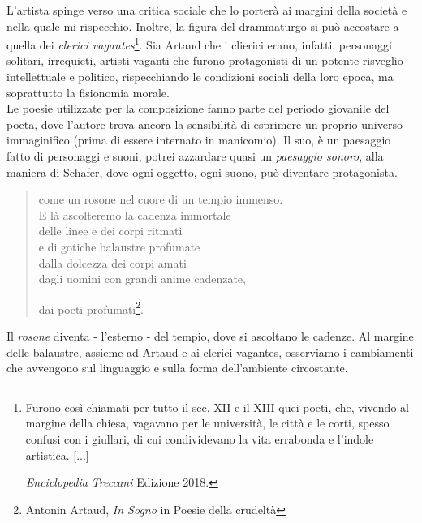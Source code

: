 L'artista spinge verso una critica sociale che lo porterà ai margini della società e nella quale mi rispecchio. Inoltre, la figura del drammaturgo si può accostare a quella dei \textit{clerici vagantes}\footnote{Furono così chiamati per tutto il sec. XII e il XIII quei poeti, che, vivendo al margine della chiesa, vagavano per le università, le città e le corti, spesso confusi con i giullari, di cui condividevano la vita errabonda e l'indole artistica. [...]

\textit{Enciclopedia Treccani} Edizione 2018.}. Sia Artaud che i clierici erano, infatti, personaggi solitari, irrequieti, artisti vaganti che furono protagonisti di un potente risveglio intellettuale e politico, rispecchiando le condizioni sociali della loro epoca, ma soprattutto la fisionomia morale. \\
Le poesie utilizzate per la composizione fanno parte del periodo giovanile del poeta, dove l'autore trova ancora la sensibilità di esprimere un proprio universo immaginifico (prima di essere internato in manicomio). Il suo, è un paesaggio fatto di personaggi e suoni, potrei azzardare quasi un \textit{paesaggio sonoro}, alla maniera di Schafer, dove ogni oggetto, ogni suono, può diventare protagonista.

\begin{quotation}
{\sf [...] come un rosone nel cuore di un tempio immenso. \\
E là ascolteremo la cadenza immortale \\
delle linee e dei corpi ritmati \\
e di gotiche balaustre profumate \\
dalla dolcezza dei corpi amati \\
dagli uomini con grandi anime cadenzate, \\
\centerline{dai poeti profumati\footnote{Antonin Artaud, \textit{In Sogno} in Poesie della crudeltà}.}}
\end{quotation}

Il \textit{rosone} diventa - l'esterno -  del tempio, dove si ascoltano le cadenze. Al margine delle balaustre, assieme ad Artaud e ai clerici vagantes, osserviamo i cambiamenti che avvengono sul linguaggio e sulla forma dell'ambiente circostante. 

